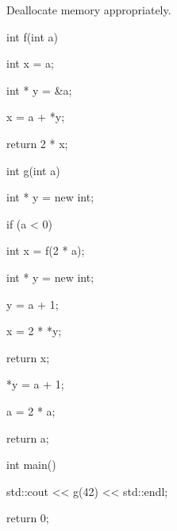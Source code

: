 Deallocate memory appropriately.



\begin{consolethree}[escapeinside=||]

int f(int a)

{

    int x = a;

    int * y = &a;

    x = a + *y;

    return 2 * x;

}



int g(int a)

{

    int * y = new int;

    if (a < 0)

    {

        int x = f(2 * a);

        int * y = new int;

        y = a + 1;

        x = 2 * *y;

        return x;

    }

    *y = a + 1;

    a = 2 * a;

    return a;

}



int main()

{

    std::cout << g(42) << std::endl;

    return 0;

}

\end{consolethree}



